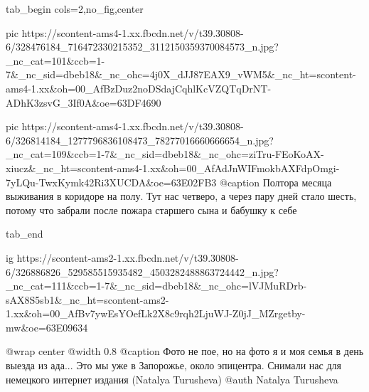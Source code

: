  
 
 
 
 


\ifcmt
  tab_begin cols=2,no_fig,center

     pic https://scontent-ams4-1.xx.fbcdn.net/v/t39.30808-6/328476184_716472330215352_3112150359370084573_n.jpg?_nc_cat=101&ccb=1-7&_nc_sid=dbeb18&_nc_ohc=4j0X_dJJ87EAX9_vWM5&_nc_ht=scontent-ams4-1.xx&oh=00_AfBzDuz2noDSdajCqhlKcVZQTqDrNT-ADhK3zsvG_3If0A&oe=63DF4690

     pic https://scontent-ams4-1.xx.fbcdn.net/v/t39.30808-6/326814184_1277796836108473_78277016660666654_n.jpg?_nc_cat=109&ccb=1-7&_nc_sid=dbeb18&_nc_ohc=ziTru-FEoKoAX-xiucz&_nc_ht=scontent-ams4-1.xx&oh=00_AfAdJnWIFmokbAXFdpOmgi-7yLQu-TwxKymk42Ri3XUCDA&oe=63E02FB3
     @caption Полтора месяца выживания в коридоре на полу. Тут нас четверо, а через пару дней стало шесть, потому что забрали после пожара старшего сына и бабушку к себе

  tab_end
\fi

\begin{minipage}{\textwidth}

\ifcmt
     ig https://scontent-ams2-1.xx.fbcdn.net/v/t39.30808-6/326886826_529585515935482_4503282488863724442_n.jpg?_nc_cat=111&ccb=1-7&_nc_sid=dbeb18&_nc_ohc=lVJMuRDrb-sAX8S5sb1&_nc_ht=scontent-ams2-1.xx&oh=00_AfBv7ywEsYOefLk2X8c9rqh2LjuWJ-Z0jJ_MZrgetby-mw&oe=63E09634

     @wrap center
     @width 0.8
     @caption Фото не пое, но на фото я и моя семья в день выезда из ада... Это мы уже в Запорожье, около эпицентра. Снимали нас для немецкого интернет издания (Natalya Turusheva)
     @auth Natalya Turusheva

\fi
\end{minipage}
